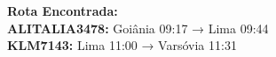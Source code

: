 \documentclass[preview]{standalone}
\begin{document}
\begin{center}
\textbf{Rota Encontrada:} \\
            \textbf{ALITALIA3478:} Goiânia 09:17 → Lima 09:44 \\
            \textbf{KLM7143:} Lima 11:00 → Varsóvia 11:31
\end{center}
\end{document}
